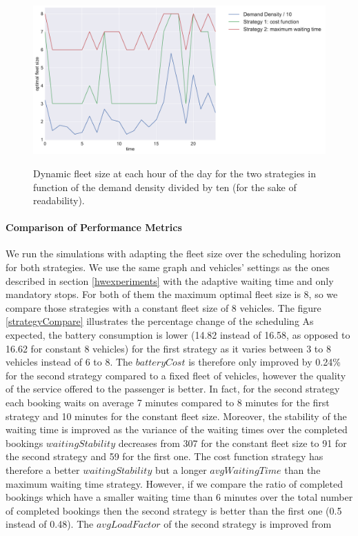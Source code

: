 \documentclass[12pt,a4paper]{article}
\begin{document}
\begin{figure}[h] 
  \centering
  \caption{Dynamic fleet size at each hour of the day for the two strategies in function of the demand density divided by ten (for the sake of readability).}
\includegraphics[scale=0.4]{./images/optimalFleet.pdf}
\label{optfleet}
\end{figure}

\paragraph{Comparison of Performance Metrics}
We run the simulations with adapting the fleet size over the scheduling horizon for both strategies. We use the same graph and vehicles' settings as the ones described in section \ref{hwexperiments} with the adaptive waiting time and only mandatory stops. For both of them the maximum optimal fleet size is 8, so we compare those strategies with a constant fleet size of 8 vehicles. The figure \ref{strategyCompare} illustrates the percentage change of the scheduling  As expected, the battery consumption is lower (14.82 instead of 16.58, as opposed to 16.62 for constant 8 vehicles) for the first strategy as it varies between 3 to 8 vehicles instead of 6 to 8. The $batteryCost$ is therefore only improved by 0.24\% for the second strategy compared to a fixed fleet of vehicles, however the quality of the service offered to the passenger is better. In fact, for the second strategy each booking waits on average 7 minutes compared to 8 minutes for the first strategy and 10 minutes for the constant fleet size. Moreover, the stability of the waiting time is improved as the variance of the waiting times over the completed bookings $waitingStability$ decreases from 307 for the constant fleet size to 91 for the second strategy and 59 for the first one. The cost function strategy has therefore a better $waitingStability$ but a longer $avgWaitingTime$ than the maximum waiting time strategy. However, if we compare the ratio of completed bookings which have a smaller waiting time than 6 minutes over the total number of completed bookings then the second strategy is better than the first one (0.5 instead of 0.48). The $avgLoadFactor$ of the second strategy is improved from 
\end{document}
